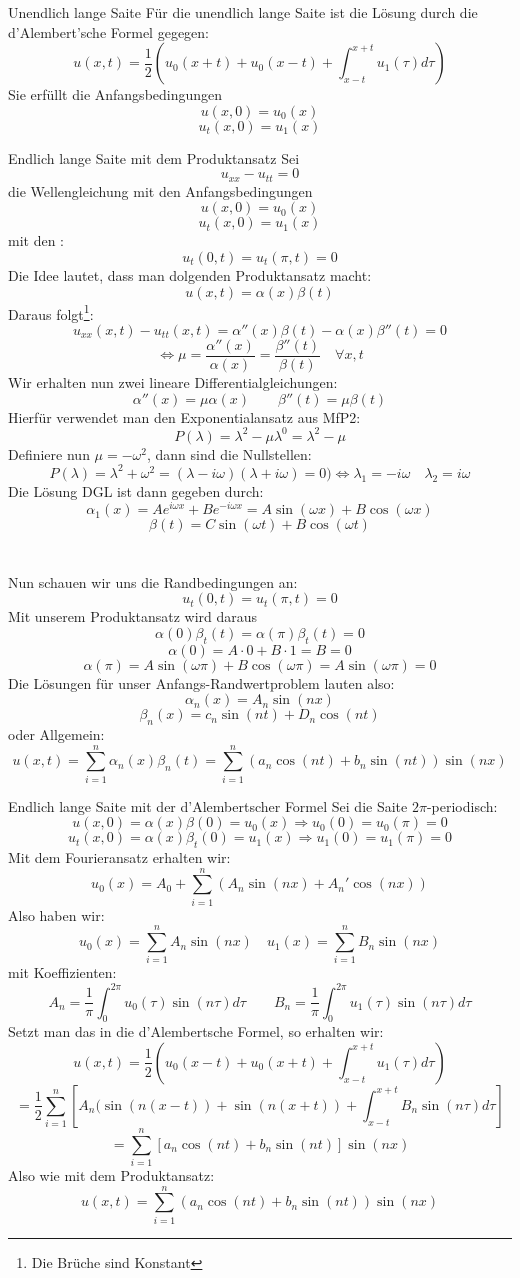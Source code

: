 \begin{Def}{Unendlich lange Saite}
Für die unendlich lange Saite ist die Lösung durch die d'Alembert'sche Formel gegegen:
$$u(x,t)=\frac{1}{2}(u_0(x+t)+u_0(x-t)+\int_{x-t}^{x+t}u_1(\tau)d\tau)$$
Sie erfüllt die Anfangsbedingungen
$$u(x,0)=u_0(x)$$
$$u_t(x,0)=u_1(x)$$
\end{Def}
\begin{Def}{Endlich lange Saite mit dem Produktansatz}
    Sei $$u_{xx}-u_{tt}=0$$
    die Wellengleichung mit den Anfangsbedingungen
    $$u(x,0)=u_0(x)$$
    $$u_t(x,0)=u_1(x)$$
    mit den :
    $$u_t(0,t)=u_t(\pi, t)=0$$
    Die Idee lautet, dass man dolgenden Produktansatz macht:
    $$u(x,t)=\alpha(x)\beta(t)$$
    Daraus folgt\footnote{Die Brüche sind Konstant}:
    $$u_{xx}(x,t)-u_{tt}(x,t)=\alpha''(x)\beta(t)-\alpha(x)\beta''(t)=0$$
    $$\iff \mu=\frac{\alpha''(x)}{\alpha(x)}=\frac{\beta''(t)}{\beta(t)} \quad \forall x,t$$
    Wir erhalten nun zwei lineare Differentialgleichungen:
    $$\alpha''(x)=\mu\alpha(x) \qquad \beta''(t)=\mu\beta(t)$$
    Hierfür verwendet man den Exponentialansatz aus MfP2:
    $$P(\lambda)=\lambda^2-\mu\lambda^0=\lambda^2-\mu$$
    Definiere nun $\mu=-\omega^2$, dann sind die Nullstellen:
    $$P(\lambda)=\lambda^2+\omega^2=(\lambda-i\omega)(\lambda+i\omega)=0)\iff \lambda_1= -i\omega \quad \lambda_2= i\omega$$
    Die Lösung DGL ist dann gegeben durch:
    $$\alpha_1(x)=Ae^{i\omega x}+Be^{-i\omega x}=A\sin(\omega x)+B\cos(\omega x)$$
    $$\beta(t)=C\sin(\omega t)+ B\cos(\omega t)$$
    \\ \\
    Nun schauen wir uns die Randbedingungen an:
    $$u_t(0,t)=u_t(\pi, t)=0$$
    Mit unserem Produktansatz wird daraus
    $$\alpha(0)\beta_t(t)=\alpha(\pi)\beta_t(t)=0$$
    $$\alpha(0)=A\cdot 0 + B\cdot 1 = B = 0$$
    $$\alpha(\pi)=A\sin(\omega \pi)+ B\cos(\omega \pi) = A\sin(\omega \pi)=0$$
    Die Lösungen für unser Anfangs-Randwertproblem lauten also:
    $$\alpha_n(x)=A_n\sin(nx)$$
    $$\beta_n(x)=c_n\sin(nt)+D_n\cos(nt)$$
    oder Allgemein:
    $$u(x,t)=\sum_{i=1}^n \alpha_n(x)\beta_n(t)=\sum_{i=1}^n (a_n\cos(nt)+b_n\sin(nt))\sin(nx)$$
\end{Def}
\begin{Def}{Endlich lange Saite mit der d'Alembertscher Formel}
Sei die Saite $2\pi$-periodisch:
$$u(x,0)=\alpha(x)\beta(0)=u_0(x) \Rightarrow u_0(0)=u_0(\pi)=0$$
$$u_t(x,0)=\alpha(x)\beta_t(0)=u_1(x) \Rightarrow u_1(0)=u_1(\pi)=0$$
Mit dem Fourieransatz erhalten wir:
$$u_0(x)=A_0+\sum_{i=1}^n (A_n\sin(nx)+A_n'\cos(nx))$$
Also haben wir:
$$u_0(x)=\sum_{i=1}^n A_n\sin(nx) \quad u_1(x)=\sum_{i=1}^n B_n\sin(nx)$$ mit Koeffizienten:
$$A_n=\frac{1}{\pi}\int_0^{2\pi}u_0(\tau)\sin(n\tau)d\tau \qquad B_n=\frac{1}{\pi}\int_0^{2\pi}u_1(\tau)\sin(n\tau)d\tau$$
Setzt man das in die d'Alembertsche Formel, so erhalten wir:
$$u(x,t)=\frac{1}{2}(u_0(x-t)+u_0(x+t)+\int_{x-t}^{x+t}u_1(\tau)d\tau)$$
$$=\frac{1}{2}\sum_{i=1}^n [A_n(\sin(n(x-t))+\sin(n(x+t))+\int_{x-t}^{x+t}B_n\sin(n\tau)d\tau]$$
$$=\sum_{i=1}^n [a_n\cos(nt)+b_n\sin(nt)]\sin(nx)$$
Also wie mit dem Produktansatz: 
    $$u(x,t)=\sum_{i=1}^n (a_n\cos(nt)+b_n\sin(nt))\sin(nx)$$
\end{Def}
